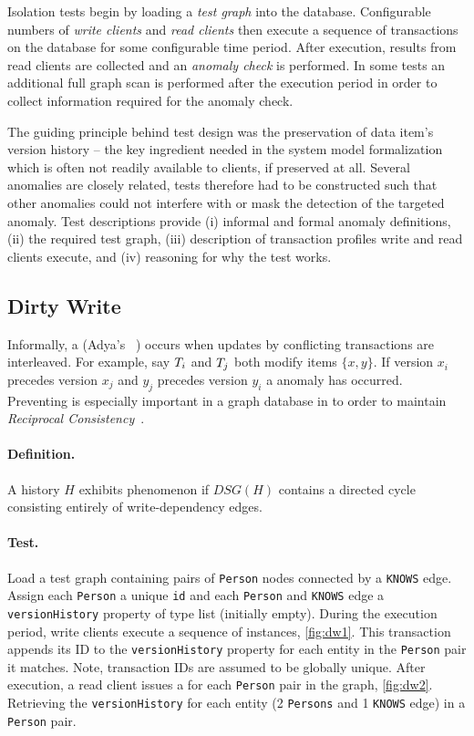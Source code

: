 Isolation tests begin by loading a \emph{test graph} into the database.
Configurable numbers of \emph{write clients} and \emph{read clients} then execute a sequence of transactions on the database for some configurable time period.
After execution, results from read clients are collected and an \emph{anomaly check} is performed.
In some tests an additional full graph scan is performed after the execution period in order to collect information required for the anomaly check.

The guiding principle behind test design was the preservation of data item's version history -- the key ingredient needed in the system model formalization which is often not readily available to clients, if preserved at all.
Several anomalies are closely related, tests therefore had to be constructed such that other anomalies could not interfere with or mask the detection of the targeted anomaly.
Test descriptions provide
(i) informal and formal anomaly definitions,
(ii) the required test graph,
(iii) description of transaction profiles write and read clients execute, and
(iv) reasoning for why the test works.

\subsection{Dirty Write}
\label{sec:dirty-write}

Informally, a  (Adya's ~\cite{adya1999weak})
occurs when updates by conflicting transactions are interleaved.
For example, say $T_i$ and $T_j$ both modify items $\{x,y\}$.
If version $x_i$ precedes version $x_j$ and $y_j$ precedes version $y_i$ a  anomaly has occurred.
Preventing  is especially important in a graph database in to order to maintain \emph{Reciprocal Consistency}~\cite{Waudby2020}.

\paragraph{Definition.}
A history $H$ exhibits phenomenon  if $\textit{DSG}(H)$ contains a directed cycle consisting entirely of write-dependency edges.

\paragraph{Test.}
Load a test graph containing pairs of \texttt{Person} nodes connected by a \texttt{KNOWS} edge.
Assign each \texttt{Person} a unique \texttt{id} and each \texttt{Person} and \texttt{KNOWS} edge a \texttt{versionHistory} property of type list (initially empty).
During the execution period, write clients execute a sequence of  instances, \autoref{fig:dw1}.
This transaction appends its ID to the \texttt{versionHistory} property for each entity in the \texttt{Person} pair it matches.
Note, transaction IDs are assumed to be globally unique.
After execution, a read client issues a  for each \texttt{Person} pair in the graph, \autoref{fig:dw2}.
Retrieving the \texttt{versionHistory} for each entity (2 \texttt{Persons} and 1 \texttt{KNOWS} edge) in a \texttt{Person} pair.

